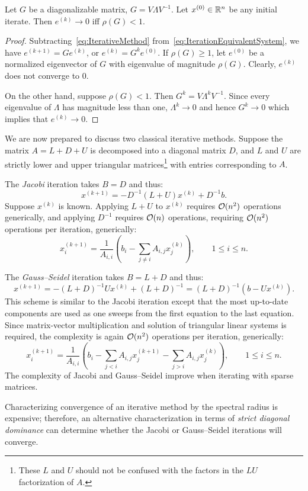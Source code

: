 \begin{theorem}
Let $G$ be a diagonalizable matrix, $G = V\Lambda V^{-1}$. Let $x^{(0)}\in\mathbb{R}^n$ be any initial iterate. Then $e^{(k)}\to 0$ iff $\rho(G)<1$.
\end{theorem}
\begin{proof}
Subtracting~\eqref{eq:IterativeMethod} from~\eqref{eq:IterationEquivalentSystem}, we have $e^{(k+1)} = Ge^{(k)}$, or $e^{(k)} = G^ke^{(0)}$. If $\rho(G)\ge1$, let $e^{(0)}$ be a normalized eigenvector of $G$ with eigenvalue of magnitude $\rho(G)$. Clearly, $e^{(k)}$ does not converge to $0$.

On the other hand, suppose $\rho(G)<1$. Then $G^k = V\Lambda^kV^{-1}$. Since every eigenvalue of $\Lambda$ has magnitude less than one, $\Lambda^k\to0$ and hence $G^k\to0$ which implies that $e^{(k)}\to0$.
\end{proof}

We are now prepared to discuss two classical iterative methods. Suppose the matrix $A = L+D+U$ is decomposed into a diagonal matrix $D$, and $L$ and $U$ are strictly lower and upper triangular matrices\footnote{These $L$ and $U$ should not be confused with the factors in the $LU$ factorization of $A$.} with entries corresponding to $A$.

The {\em Jacobi} iteration takes $B=D$ and thus:
\[
x^{(k+1)} = -D^{-1}(L+U)x^{(k)} + D^{-1}b.
\]
Suppose $x^{(k)}$ is known. Applying $L+U$ to $x^{(k)}$ requires $\mathcal{O}(n^2)$ operations generically, and applying $D^{-1}$ requires $\mathcal{O}(n)$ operations, requiring $\mathcal{O}(n^2)$ operations per iteration, generically:
\[
x_i^{(k+1)} = \dfrac{1}{A_{i,i}}\left(b_i-\sum_{j\ne i}A_{i,j}x_j^{(k)}\right),\qquad 1\le i\le n.
\]

The {\em Gauss--Seidel} iteration takes $B=L+D$ and thus:
\[
x^{(k+1)} = -(L+D)^{-1}Ux^{(k)} + (L+D)^{-1} = (L+D)^{-1}(b-Ux^{(k)}).
\]
This scheme is similar to the Jacobi iteration except that the most up-to-date components are used as one sweeps from the first equation to the last equation. Since matrix-vector multiplication and solution of triangular linear systems is required, the complexity is again $\mathcal{O}(n^2)$ operations per iteration, generically:
\[
x_i^{(k+1)} = \dfrac{1}{A_{i,i}}\left(b_i-\sum_{j< i}A_{i,j}x_j^{(k+1)} - \sum_{j>i}A_{i,j}x_j^{(k)}\right),\qquad 1\le i\le n.
\]
The complexity of Jacobi and Gauss--Seidel improve when iterating with sparse matrices.

Characterizing convergence of an iterative method by the spectral radius is expensive; therefore, an alternative characterization in terms of {\em strict diagonal dominance} can determine whether the Jacobi or Gauss--Seidel iterations will converge.

